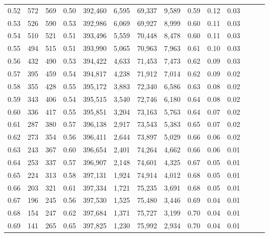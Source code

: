 \begin{tabular}{rrrrrrrrrrrrrr}
0.52 &     572 &    569 &  0.50 &  392,460 &    6,595 &  69,337 &   9,589 &  0.59 &  0.12 &      0.03 \\
0.53 &     526 &    590 &  0.53 &  392,986 &    6,069 &  69,927 &   8,999 &  0.60 &  0.11 &      0.03 \\
0.54 &     510 &    521 &  0.51 &  393,496 &    5,559 &  70,448 &   8,478 &  0.60 &  0.11 &      0.03 \\
0.55 &     494 &    515 &  0.51 &  393,990 &    5,065 &  70,963 &   7,963 &  0.61 &  0.10 &      0.03 \\
0.56 &     432 &    490 &  0.53 &  394,422 &    4,633 &  71,453 &   7,473 &  0.62 &  0.09 &      0.03 \\
0.57 &     395 &    459 &  0.54 &  394,817 &    4,238 &  71,912 &   7,014 &  0.62 &  0.09 &      0.02 \\
0.58 &     355 &    428 &  0.55 &  395,172 &    3,883 &  72,340 &   6,586 &  0.63 &  0.08 &      0.02 \\
0.59 &     343 &    406 &  0.54 &  395,515 &    3,540 &  72,746 &   6,180 &  0.64 &  0.08 &      0.02 \\
0.60 &     336 &    417 &  0.55 &  395,851 &    3,204 &  73,163 &   5,763 &  0.64 &  0.07 &      0.02 \\
0.61 &     287 &    380 &  0.57 &  396,138 &    2,917 &  73,543 &   5,383 &  0.65 &  0.07 &      0.02 \\
0.62 &     273 &    354 &  0.56 &  396,411 &    2,644 &  73,897 &   5,029 &  0.66 &  0.06 &      0.02 \\
0.63 &     243 &    367 &  0.60 &  396,654 &    2,401 &  74,264 &   4,662 &  0.66 &  0.06 &      0.01 \\
0.64 &     253 &    337 &  0.57 &  396,907 &    2,148 &  74,601 &   4,325 &  0.67 &  0.05 &      0.01 \\
0.65 &     224 &    313 &  0.58 &  397,131 &    1,924 &  74,914 &   4,012 &  0.68 &  0.05 &      0.01 \\
0.66 &     203 &    321 &  0.61 &  397,334 &    1,721 &  75,235 &   3,691 &  0.68 &  0.05 &      0.01 \\
0.67 &     196 &    245 &  0.56 &  397,530 &    1,525 &  75,480 &   3,446 &  0.69 &  0.04 &      0.01 \\
0.68 &     154 &    247 &  0.62 &  397,684 &    1,371 &  75,727 &   3,199 &  0.70 &  0.04 &      0.01 \\
0.69 &     141 &    265 &  0.65 &  397,825 &    1,230 &  75,992 &   2,934 &  0.70 &  0.04 &      0.01 \\

\end{tabular}
